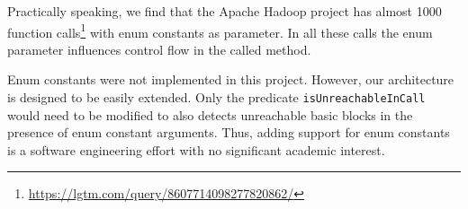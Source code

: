 Practically speaking, we find that the Apache Hadoop project has almost 1000
function calls\footnote{\url{https://lgtm.com/query/8607714098277820862/}} with 
enum constants as parameter.
In all these calls the enum parameter influences control flow in the called method.

Enum constants were not implemented in this project.
However, our architecture is designed to be easily extended.
Only the predicate \texttt{isUnreachableInCall} would need to be modified 
to also detects unreachable basic blocks in the presence of enum constant arguments.
Thus, adding support for enum constants is a software engineering effort
with no significant academic interest.

